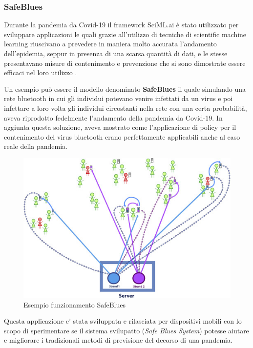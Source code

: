\subsubsection{SafeBlues}
Durante la pandemia da Covid-19 il framework SciML.ai è stato 
utilizzato per sviluppare applicazioni le quali grazie 
all’utilizzo di tecniche di scientific machine learning 
riuscivano a prevedere in maniera molto accurata l’andamento 
dell’epidemia, seppur in presenza di una scarsa quantità di dati,
e le stesse presentavano misure di contenimento e prevenzione 
che si sono dimostrate essere efficaci nel loro utilizzo
\cite{10.1371/journal.pdig.0000142} \cite{DANDEKAR2021100220}. 

Un esempio può essere il modello denominato \textbf{SafeBlues} 
\cite{10.1371/journal.pdig.0000142} \cite{DANDEKAR2021100220} 
il quale simulando una rete bluetooth in cui gli individui potevano 
venire infettati da un virus e poi infettare a loro volta gli 
individui circostanti nella rete con una certa probabilità, 
aveva riprodotto fedelmente l’andamento della pandemia da Covid-19. 
In aggiunta questa soluzione, aveva mostrato come 
l’applicazione di policy per il contenimento del virus 
bluetooth erano perfettamente applicabili anche al caso 
reale della pandemia.

\begin{figure}[h]
    \includegraphics[width=\linewidth]{img/gr2.jpg}
    \caption{Esempio funzionamento SafeBlues}
    \label{fig:SafeBlues_1}
\end{figure}

Questa applicazione e' stata sviluppata e rilasciata per dispositivi
mobili con lo scopo di sperimentare se il sistema svilupatto (\emph{Safe Blues System})
potesse aiutare e migliorare i tradizionali metodi di previsione 
del decorso di una pandemia.